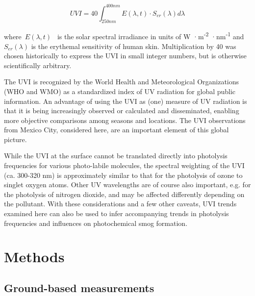 \documentclass[journal=jacsat,manuscript=article]{achemso}
\begin{document}
\begin{equation}
  \label{eq:UVI}
  UVI=40 \int_{250nm}^{400nm} E\left(\lambda,t\right) \cdot S_{er}(\lambda) d\lambda
\end{equation}

where~\(E(\lambda,t)\)\emph{~} is the solar spectral irradiance in
units of W ·m\textsuperscript{-2} ·nm\textsuperscript{-1}
and~\(S_{er}\left(\lambda\right)\) is the erythemal sensitivity of human
skin.\citep{who2002,Webb_2011}
Multiplication by 40 was chosen historically to
express the UVI in small integer numbers, but is otherwise
scientifically arbitrary.

The UVI is recognized by the World Health and Meteorological
Organizations (WHO and WMO) as a standardized index of UV
radiation\cite{who2002} for global public information. An advantage
of using the UVI as (one) measure of UV radiation is that it is being
increasingly observed or calculated and disseminated, enabling more
objective comparisons among seasons and locations. The UVI observations
from Mexico City, considered here, are an important element of this
global picture.

While the UVI at the surface cannot be translated directly into
photolysis frequencies for various photo-labile molecules, the spectral
weighting of the UVI (ca. 300-320 nm) is approximately similar to that
for the photolysis of ozone to singlet oxygen atoms. Other UV
wavelengths are of course also important, e.g. for the photolysis of
nitrogen dioxide, and may be affected differently depending on the
pollutant. With these considerations and a few other caveats, UVI trends
examined here can also be used to infer accompanying trends in
photolysis frequencies and influences on photochemical smog formation.




\section{Methods}
\label{sec:methods}

\subsection{Ground-based measurements}
\end{document}
